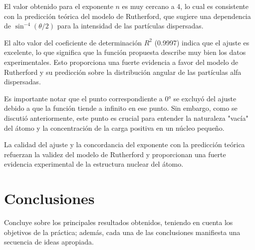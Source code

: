 \documentclass[twocolumn,a4paper,11pt]{scrartcl}
\begin{document}
El valor obtenido para el exponente $n$ es muy cercano a 4, lo cual es consistente con la predicción teórica del modelo de Rutherford, que sugiere una dependencia de $\sin^{-4}(\theta/2)$ para la intensidad de las partículas dispersadas.

El alto valor del coeficiente de determinación $R^2$ (0.9997) indica que el ajuste es excelente, lo que significa que la función propuesta describe muy bien los datos experimentales. Esto proporciona una fuerte evidencia a favor del modelo de Rutherford y su predicción sobre la distribución angular de las partículas alfa dispersadas.

Es importante notar que el punto correspondiente a 0° se excluyó del ajuste debido a que la función tiende a infinito en ese punto. Sin embargo, como se discutió anteriormente, este punto es crucial para entender la naturaleza "vacía" del átomo y la concentración de la carga positiva en un núcleo pequeño.

La calidad del ajuste y la concordancia del exponente con la predicción teórica refuerzan la validez del modelo de Rutherford y proporcionan una fuerte evidencia experimental de la estructura nuclear del átomo.

\section{Conclusiones}
Concluye sobre los principales resultados obtenidos, teniendo en cuenta los objetivos de la práctica; además, cada una de las conclusiones manifiesta una secuencia de ideas apropiada.



\end{document}
